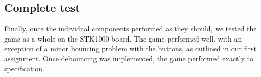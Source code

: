 \subsection{Complete test}
Finally, once the individual components performed as they should, we tested the game as a whole on the STK1000 board. The game performed well, with an exception of a minor bouncing problem with the buttons, as outlined in our first assignment. Once debouncing was implemented, the game performed exactly to specification.